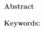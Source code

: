 

\begin{latin}
	
	{\textbf{\Large Abstract}}
	\vskip 1cm
	\noindent
	
	\vspace{3cm}
	\textbf{Keywords:}
	
\end{latin}